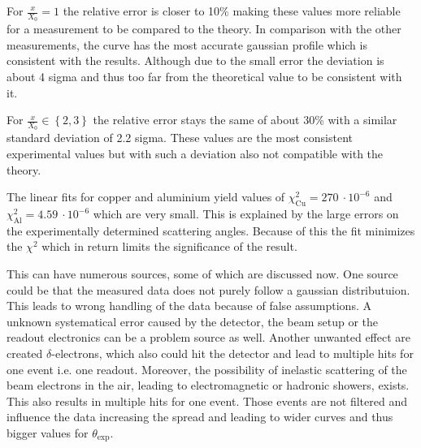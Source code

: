 \documentclass[sn-mathphys-num,iicol]{sn-jnl}
\theoremstyle{thmstyleone}
\theoremstyle{thmstyletwo}
\theoremstyle{thmstylethree}
\begin{document}
For $\tfrac{x}{X_0}=1$ the relative error is closer to 10\% making these values more reliable for a measurement to be compared to the theory.
In comparison with the other measurements, the curve has the most accurate gaussian profile which is consistent with the results.
Although due to the small error the deviation is about 4 sigma and thus too far from the theoretical value to be consistent with it.

For $\tfrac{x}{X_0} \in \left\{2,3\right\}$ the relative error stays the same of about 30\% with a similar standard deviation of 2.2 sigma.
These values are the most consistent experimental values but with such a deviation also not compatible with the theory.




The linear fits for copper and aluminium yield values of $\chi ^2_\text{Cu}=\SI{270}{}\cdot10^{-6}$ and $\chi ^2_\text{Al}=\SI{4.59}{}\cdot10^{-6}$ which are very small.
This is explained by the large errors on the experimentally determined scattering angles.
Because of this the fit minimizes the $\chi^2$ which in return limits the significance of the result.

This can have numerous sources, some of which are discussed now.
One source could be that the measured data does not purely follow a gaussian distributuion. 
This leads to wrong handling of the data because of false assumptions.
A unknown systematical error caused by the detector, the beam setup or the readout electronics can be a problem source as well. 
Another unwanted effect are created $\delta$-electrons, which also could hit the detector and lead to multiple hits for one event i.e. one readout.
Moreover, the possibility of inelastic scattering of the beam electrons in the air, leading to electromagnetic or hadronic showers, exists.
This also results in multiple hits for one event.
Those events are not filtered and influence the data increasing the spread and leading to wider curves and thus bigger values for $\theta_{\text{exp}}$.
\end{document}
